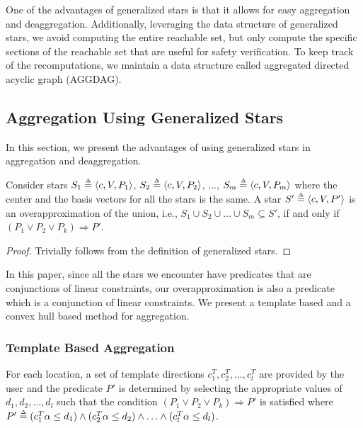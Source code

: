 One of the advantages of generalized stars is that it allows for easy aggregation and deaggregation. 
%
Additionally, leveraging the data structure of generalized stars, we avoid computing the entire reachable set, but only compute the specific sections of the reachable set that are useful for safety verification.
%
To keep track of the recomputations, we maintain a data structure called aggregated directed acyclic graph (AGGDAG).


\subsection{Aggregation Using Generalized Stars}
\label{sec:aggStars}

In this section, we present the advantages of using generalized stars in aggregation and deaggregation. 
%

\begin{lemma}
\label{lem:agg}
Consider stars $S_1 \deq \tup{c, V, P_1}$, $S_2 \deq \tup{c, V, P_2}$, $\ldots$, $S_m \deq \tup{c, V, P_m}$ where the center and the basis vectors for all the stars is the same.
%
A star $S' \deq \tup{c, V, P'}$ is an overapproximation of the union, i.e., $S_1 \cup S_2 \cup \ldots \cup S_m \subseteq S'$, if and only if $(P_1 \vee P_2 \vee P_k) \Rightarrow P'$.
\end{lemma}
\begin{proof}
Trivially follows from the definition of generalized stars.
\end{proof}

In this paper, since all the stars we encounter have predicates that are conjunctions of linear constraints, our overapproximation is also a predicate which is a conjunction of linear constraints. We present a template based and a convex hull based method for aggregation.

\subsubsection{Template Based Aggregation}
%
%
For each location, a set of template directions $c_1^{T}, c_2^{T}, \ldots, c_{l}^{T}$ are provided by the user and the predicate $P'$ is determined by selecting the appropriate values of $d_1, d_2, \ldots, d_l$ such that the condition $(P_1 \vee P_2 \vee P_k) \Rightarrow P'$ is satisfied where $P' \mathrel{\stackrel{\scriptscriptstyle\Delta}{=}} (c_1^{T}\alpha \leq d_1) \wedge (c_2^{T}\alpha \leq d_2) \wedge \ldots \wedge (c_l^{T}\alpha \leq d_l)$. 

